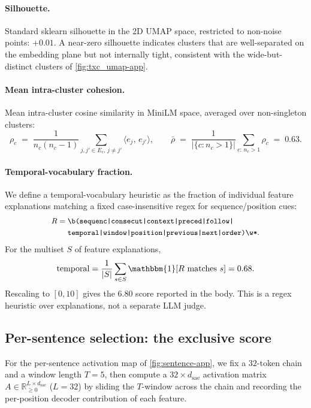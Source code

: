 \paragraph{Silhouette.} Standard sklearn silhouette in the 2D UMAP space, restricted to non-noise points: $+0.01$. A near-zero silhouette indicates clusters that are well-separated on the embedding plane but not internally tight, consistent with the wide-but-distinct clusters of \cref{fig:txc_umap-app}.

\paragraph{Mean intra-cluster cohesion.} Mean intra-cluster cosine similarity in MiniLM space, averaged over non-singleton clusters:
\begin{equation}
    \rho_c \;=\; \frac{1}{n_c(n_c-1)} \sum_{j, j' \in E_c,\, j\neq j'} \langle e_j,\, e_{j'}\rangle,
    \qquad
    \bar{\rho} \;=\; \frac{1}{|\{c: n_c > 1\}|}\sum_{c:\,n_c>1}\rho_c \;=\; 0.63.
\end{equation}

\paragraph{Temporal-vocabulary fraction.}
We define a temporal-vocabulary heuristic as the fraction of individual feature
explanations matching a fixed case-insensitive regex for sequence/position cues:
\[
\small
\begin{aligned}
R ={}& \texttt{\textbackslash b(sequenc|consecut|context|preced|follow|}\\
     & \texttt{temporal|window|position|previous|next|order)\textbackslash w*}.
\end{aligned}
\]
For the multiset $S$ of feature explanations,
\[
    \mathrm{temporal}
    =
    \frac{1}{|S|}\sum_{s\in S}\mathbbm{1}[R \text{ matches } s]
    =
    0.68.
\]
Rescaling to $[0,10]$ gives the $6.80$ score reported in the body. This is a regex heuristic over explanations, not a separate LLM judge.

\subsection{Per-sentence selection: the exclusive score}
\label{app:meta-exclusive}
For the per-sentence activation map of \cref{fig:sentence-app}, we fix a $32$-token chain and a window length $T{=}5$, then compute a $32 \times d_{\text{sae}}$ activation matrix $A\in\mathbb{R}_{\geq 0}^{L\times d_{\text{sae}}}$ ($L{=}32$) by sliding the $T$-window across the chain and recording the per-position decoder contribution of each feature.

